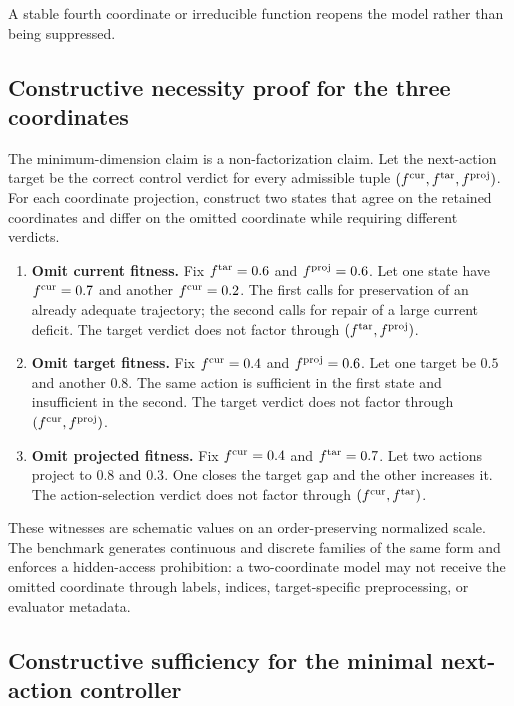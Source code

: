\documentclass[11pt]{article}
\begin{document}
A stable fourth coordinate or irreducible function reopens the model rather than being suppressed.


\subsection{Constructive necessity proof for the three coordinates}

The minimum-dimension claim is a non-factorization claim. Let the next-action target be the correct control verdict for every admissible tuple $(f^{\rm cur},f^{\rm tar},f^{\rm proj})$. For each coordinate projection, construct two states that agree on the retained coordinates and differ on the omitted coordinate while requiring different verdicts.

\begin{enumerate}
\item \textbf{Omit current fitness.} Fix $f^{\rm tar}=0.6$ and $f^{\rm proj}=0.6$. Let one state have $f^{\rm cur}=0.7$ and another $f^{\rm cur}=0.2$. The first calls for preservation of an already adequate trajectory; the second calls for repair of a large current deficit. The target verdict does not factor through $(f^{\rm tar},f^{\rm proj})$.
\item \textbf{Omit target fitness.} Fix $f^{\rm cur}=0.4$ and $f^{\rm proj}=0.6$. Let one target be $0.5$ and another $0.8$. The same action is sufficient in the first state and insufficient in the second. The target verdict does not factor through $(f^{\rm cur},f^{\rm proj})$.
\item \textbf{Omit projected fitness.} Fix $f^{\rm cur}=0.4$ and $f^{\rm tar}=0.7$. Let two actions project to $0.8$ and $0.3$. One closes the target gap and the other increases it. The action-selection verdict does not factor through $(f^{\rm cur},f^{\rm tar})$.
\end{enumerate}

These witnesses are schematic values on an order-preserving normalized scale. The benchmark generates continuous and discrete families of the same form and enforces a hidden-access prohibition: a two-coordinate model may not receive the omitted coordinate through labels, indices, target-specific preprocessing, or evaluator metadata.

\subsection{Constructive sufficiency for the minimal next-action controller}
\end{document}
